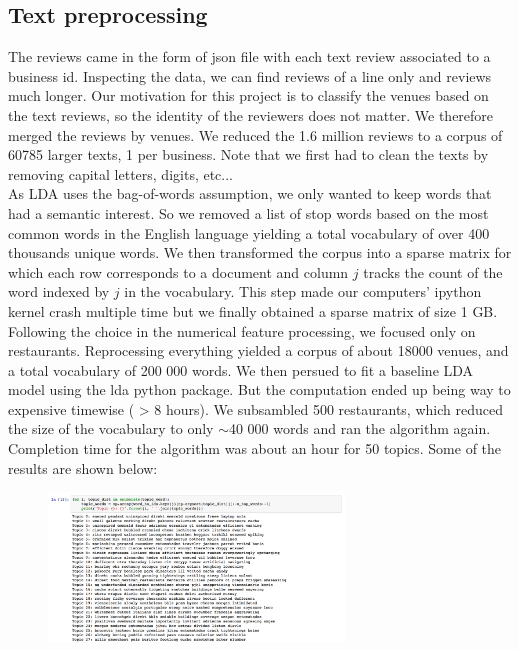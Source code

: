 \documentclass[paper=a4, fontsize=11pt]{scrartcl} %
\numberwithin{equation}{section}
\numberwithin{figure}{section}
\numberwithin{table}{section}
\begin{document}
\subsection{Text preprocessing}
 The reviews came in the form of json file with each text review associated to a business id. Inspecting the data, we can find reviews of a line only and reviews much longer. Our motivation for this project is to classify the venues based on the text reviews, so the identity of the reviewers does not matter. We therefore merged the reviews by venues. We reduced the 1.6 million reviews to a corpus of 60785 larger texts, 1 per business. Note that we first had to clean the texts by removing capital letters, digits, etc... \\

As LDA uses the bag-of-words assumption, we only wanted to keep words that had a semantic interest. So we removed a list of stop words based on the most common words in the English language yielding a total vocabulary of over 400 thousands unique words. We then transformed the corpus into a sparse matrix for which each row corresponds to a document and column $j$ tracks the count of the word indexed by $j$ in the vocabulary. This step made our computers' ipython kernel crash multiple time but we finally obtained a sparse matrix of size 1 GB.\\

Following the choice in the numerical feature processing, we focused only on restaurants. Reprocessing everything yielded a corpus of about 18000 venues, and a total vocabulary of 200 000 words. We then persued to fit a baseline LDA model using the lda python package. But the computation ended up being way to expensive timewise ( > 8 hours). We subsambled 500 restaurants, which reduced the size of the vocabulary to only $\sim$40 000 words and ran the algorithm again. Completion time for the algorithm was about an hour for 50 topics. Some of the results are shown below:

\begin{figure}[h!]
\centering
\includegraphics[width=0.7\textwidth]{first_topics.png}
\end{figure}
\end{document}

